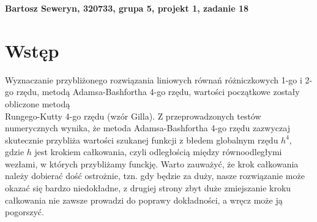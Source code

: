 \documentclass[a4paper,12pt]{article}
\begin{document}
\def\tablename{Tabela} %


\noindent
\textbf{Bartosz Seweryn, 320733, grupa 5, projekt 1, zadanie 18}


\section*{Wstęp} %
Wyznaczanie przybliżonego rozwiązania liniowych równań różniczkowych 1-go i 2-go rzędu, metodą Adamsa-Bashfortha 4-go rzędu, wartości początkowe zostały obliczone metodą \\Rungego-Kutty 4-go rzędu (wzór Gilla). Z przeprowadzonych testów numerycznych wynika, że metoda Adamsa-Bashfortha 4-go rzędu zazwyczaj skutecznie przybliża wartości szukanej funkcji z błedem globalnym rzędu $h^4$, gdzie $h$ jest krokiem całkowania, czyli odległością między równoodległymi wezłami, w których przybliżamy funckję. Warto zauważyć, że krok całkowania należy dobierać dość ostrożnie, tzn. gdy będzie za duży, nasze rozwiązanie może okazać się bardzo niedokładne, z drugiej strony zbyt duże zmiejszanie kroku całkowania nie zawsze prowadzi do poprawy dokładności, a wręcz może ją pogorszyć. 
\end{document}
